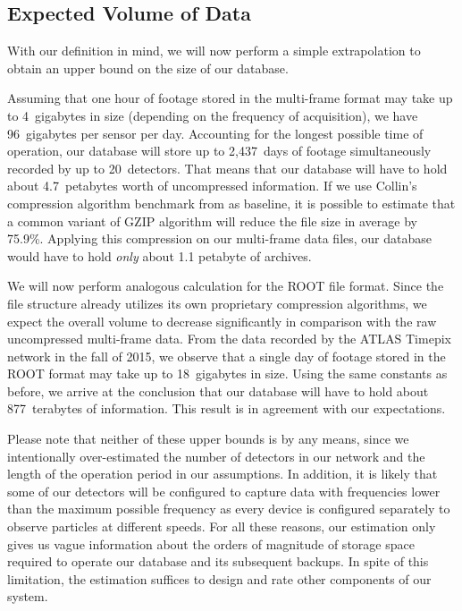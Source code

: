 \subsection{Expected Volume of Data}
With our definition in mind, we will now perform a simple extrapolation to obtain an upper bound on the size of our database.

Assuming that one hour of footage stored in the multi-frame format may take up to 4~gigabytes in size (depending on the frequency of acquisition), we have 96~gigabytes per sensor per day. Accounting for the longest possible time of operation, our database will store up to 2,437~days of footage simultaneously recorded by up to 20~detectors. That means that our database will have to hold about 4.7~petabytes worth of uncompressed information. If we use Collin's compression algorithm benchmark from \cite{GzipBenchmark} as baseline, it is possible to estimate that a common variant of GZIP algorithm will reduce the file size in average by 75.9\%. Applying this compression on our multi-frame data files, our database would have to hold \textit{only} about 1.1 petabyte of archives.

We will now perform analogous calculation for the ROOT file format. Since the file structure already utilizes its own proprietary compression algorithms, we expect the overall volume to decrease significantly in comparison with the raw uncompressed multi-frame data. From the data recorded by the ATLAS Timepix network in the fall of 2015, we observe that a single day of footage stored in the ROOT format may take up to 18~gigabytes in size. Using the same constants as before, we arrive at the conclusion that our database will have to hold about 877~terabytes of information. This result is in agreement with our expectations.

Please note that neither of these upper bounds is by any means, since we intentionally over-estimated the number of detectors in our network and the length of the operation period in our assumptions. In addition, it is likely that some of our detectors will be configured to capture data with frequencies lower than the maximum possible frequency as every device is configured separately to observe particles at different speeds. For all these reasons, our estimation only gives us vague information about the orders of magnitude of storage space required to operate our database and its subsequent backups. In spite of this limitation, the estimation suffices to design and rate other components of our system. 


